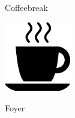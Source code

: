 \documentclass[a4paper]{article}
\begin{document}
\printVSLEventHeader{}{}
\begin{center}
\begin{vsltext}{3cm}{4cm}
    Coffeebreak

    \includegraphics[height=3cm, keepaspectratio=true]{coffeecup.png}


    \vspace{1cm}

    Foyer
\end{vsltext}

\end{center}
\end{document}
